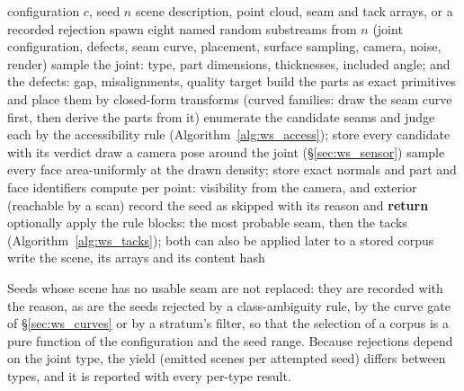 \begin{algorithm}[htbp]
\caption{Generating one WeldSet scene}
\label{alg:ws_generate}
\begin{algorithmic}[1]
\REQUIRE configuration $c$, seed $n$
\ENSURE scene description, point cloud, seam and tack arrays, or a recorded rejection
\STATE spawn eight named random substreams from $n$ (joint configuration, defects, seam curve, placement, surface sampling, camera, noise, render)
\STATE sample the joint: type, part dimensions, thicknesses, included angle; and the defects: gap, misalignments, quality target
\STATE build the parts as exact primitives and place them by closed-form transforms (curved families: draw the seam curve first, then derive the parts from it)
\STATE enumerate the candidate seams and judge each by the accessibility rule (Algorithm~\ref{alg:ws_access}); store every candidate with its verdict
\STATE draw a camera pose around the joint (\S\ref{sec:ws_sensor})
\STATE sample every face area-uniformly at the drawn density; store exact normals and part and face identifiers
\STATE compute per point: visibility from the camera, and exterior (reachable by a scan)
  \STATE record the seed as skipped with its reason and \textbf{return}
\ENDIF
\STATE optionally apply the rule blocks: the most probable seam, then the tacks (Algorithm~\ref{alg:ws_tacks}); both can also be applied later to a stored corpus
\STATE write the scene, its arrays and its content hash
\end{algorithmic}
\end{algorithm}

Seeds whose scene has no usable seam are not replaced: they are recorded with the reason, as
are the seeds rejected by a class-ambiguity rule, by the curve gate of \S\ref{sec:ws_curves} or by
a stratum's filter, so that the selection of a corpus is a pure function of the configuration and
the seed range. Because rejections depend on the joint type, the yield (emitted scenes per
attempted seed) differs between types, and it is reported with every per-type result.

